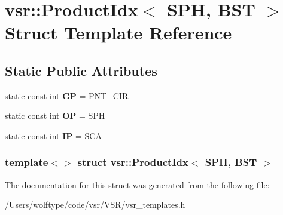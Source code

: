 \hypertarget{structvsr_1_1_product_idx_3_01_s_p_h_00_01_b_s_t_01_4}{\section{vsr\-:\-:Product\-Idx$<$ S\-P\-H, B\-S\-T $>$ Struct Template Reference}
\label{structvsr_1_1_product_idx_3_01_s_p_h_00_01_b_s_t_01_4}
}
\subsection*{Static Public Attributes}
\begin{DoxyCompactItemize}
\item 
\hypertarget{structvsr_1_1_product_idx_3_01_s_p_h_00_01_b_s_t_01_4_a6baef839c3d2454e96f5a0d7fe14a03a}{static const int {\bfseries G\-P} = P\-N\-T\-\_\-\-C\-I\-R}\label{structvsr_1_1_product_idx_3_01_s_p_h_00_01_b_s_t_01_4_a6baef839c3d2454e96f5a0d7fe14a03a}

\item 
\hypertarget{structvsr_1_1_product_idx_3_01_s_p_h_00_01_b_s_t_01_4_a850d46561518db589ad7e286e8b12375}{static const int {\bfseries O\-P} = S\-P\-H}\label{structvsr_1_1_product_idx_3_01_s_p_h_00_01_b_s_t_01_4_a850d46561518db589ad7e286e8b12375}

\item 
\hypertarget{structvsr_1_1_product_idx_3_01_s_p_h_00_01_b_s_t_01_4_a0a6b6716a762e49c383bf097d7247a55}{static const int {\bfseries I\-P} = S\-C\-A}\label{structvsr_1_1_product_idx_3_01_s_p_h_00_01_b_s_t_01_4_a0a6b6716a762e49c383bf097d7247a55}

\end{DoxyCompactItemize}
\subsubsection*{template$<$$>$ struct vsr\-::\-Product\-Idx$<$ S\-P\-H, B\-S\-T $>$}



The documentation for this struct was generated from the following file\-:\begin{DoxyCompactItemize}
\item 
/\-Users/wolftype/code/vsr/\-V\-S\-R/vsr\-\_\-templates.\-h\end{DoxyCompactItemize}
